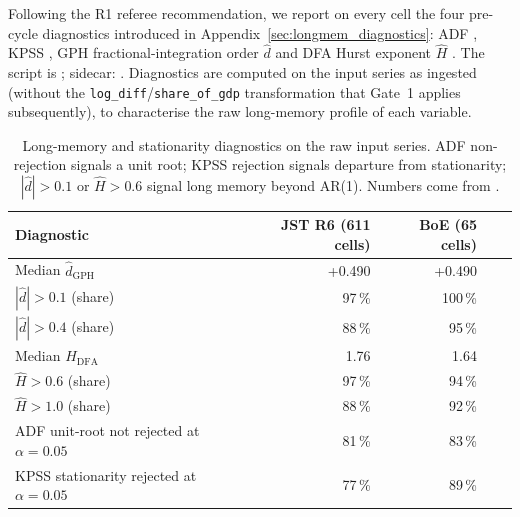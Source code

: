 Following the R1 referee recommendation, we report on every cell
the four pre-cycle diagnostics introduced in
Appendix~\ref{sec:longmem_diagnostics}: ADF
\citep{dickey_fuller1979}, KPSS \citep{kpss1992}, GPH
fractional-integration order \(\hat d\)
\citep{geweke_porter_hudak1983} and DFA Hurst exponent
\(\hat H\) \citep{peng1994}. The script is
; sidecar:
. Diagnostics are
computed on the input series as ingested (without the
\texttt{log\_diff}/\texttt{share\_of\_gdp} transformation that
Gate~1 applies subsequently), to characterise the
raw long-memory profile of each variable.

\begin{table}[h]
\centering
\caption{Long-memory and stationarity diagnostics on the raw
input series. ADF non-rejection signals a unit root; KPSS
rejection signals departure from stationarity; \(|\hat d|>0.1\)
or \(\hat H>0.6\) signal long memory beyond AR(1). Numbers come
from .}
\label{tab:longmem_summary}
\small
\begin{tabularx}{\linewidth}{@{}X r r r r@{}}
\toprule
\textbf{Diagnostic} & \textbf{JST R6 (611 cells)} & \textbf{BoE (65 cells)} \\
\midrule
Median \(\hat d_{\mathrm{GPH}}\)               & +0.490 & +0.490 \\
\(|\hat d|>0.1\) (share)                       & 97\,\% & 100\,\% \\
\(|\hat d|>0.4\) (share)                       & 88\,\% & 95\,\% \\
Median \(\hat H_{\mathrm{DFA}}\)               & 1.76   & 1.64 \\
\(\hat H>0.6\) (share)                         & 97\,\% & 94\,\% \\
\(\hat H>1.0\) (share)                         & 88\,\% & 92\,\% \\
ADF unit-root not rejected at \(\alpha=0.05\)  & 81\,\% & 83\,\% \\
KPSS stationarity rejected at \(\alpha=0.05\)  & 77\,\% & 89\,\% \\
\bottomrule
\end{tabularx}
\end{table}

